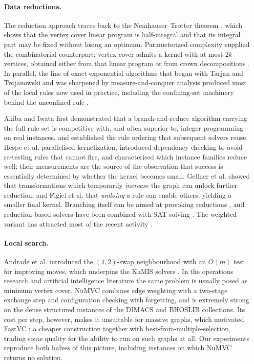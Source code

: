 \documentclass[preprint,12pt]{elsarticle}
\theoremstyle{definition}
\begin{document}
\paragraph{Data reductions.} The reduction approach traces back to the
Nemhauser--Trotter theorem \cite{nemhauser1975}, which shows that the vertex
cover linear program is half-integral and that its integral part may be fixed
without losing an optimum. Parameterized complexity supplied the combinatorial
counterpart: vertex cover admits a kernel with at most $2k$ vertices, obtained
either from that linear program or from crown decompositions
\cite{chen2001,abukhzam2007}. In parallel, the line of exact exponential
algorithms that began with Tarjan and Trojanowski \cite{tarjan1977} and was
sharpened by measure-and-conquer analysis \cite{fomin2009} produced most of the
local rules now used in practice, including the confining-set machinery behind
the unconfined rule \cite{xiao2013,xiao2017}.

Akiba and Iwata \cite{akiba2016} first demonstrated that a branch-and-reduce
algorithm carrying the full rule set is competitive with, and often superior to,
integer programming on real instances, and established the rule ordering that
subsequent solvers reuse. Hespe et al. \cite{hespe2019} parallelised
kernelization, introduced dependency checking to avoid re-testing rules that
cannot fire, and characterised which instance families reduce well; their
measurements are the source of the observation that success is essentially
determined by whether the kernel becomes small. Gellner et al.
\cite{gellner2021} showed that transformations which temporarily \emph{increase}
the graph can unlock further reduction, and Figiel et al. \cite{figiel2022}
that \emph{undoing} a rule can enable others, yielding a smaller final kernel.
Branching itself can be aimed at provoking reductions \cite{hespe2021}, and
reduction-based solvers have been combined with SAT solving
\cite{plachetta2021}. The weighted variant has attracted most of the recent
activity \cite{lamm2019,xiaowww2021,grossmann2023,langedal2022}.

\paragraph{Local search.} Andrade et al. \cite{andrade2012} introduced the
$(1,2)$-swap neighbourhood with an $O(m)$ test for improving moves, which
underpins the KaMIS solvers \cite{lamm2017,dahlum2016}. In the operations
research and artificial intelligence literature the same problem is usually
posed as minimum vertex cover. NuMVC \cite{cai2013numvc} combines edge weighting
with a two-stage exchange step and configuration checking with forgetting, and
is extremely strong on the dense structured instances of the DIMACS and BHOSLIB
collections. Its cost per step, however, makes it unsuitable for massive graphs,
which motivated FastVC \cite{cai2015,cai2017fastvc}: a cheaper construction
together with best-from-multiple-selection, trading some quality for the ability
to run on such graphs at all. Our experiments reproduce both halves of this
picture, including instances on which NuMVC returns no solution.
\end{document}
